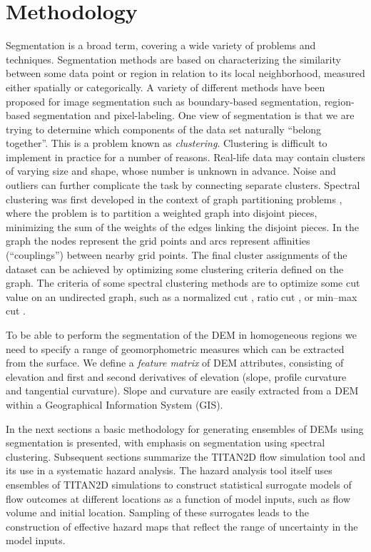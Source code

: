 \documentclass[12pt,letterpaper]{article}
\begin{document}
\section{Methodology}
Segmentation is a broad term, covering a wide variety of problems and techniques. 
Segmentation methods are based on characterizing the similarity between some data point or region 
in relation to its local neighborhood, measured either spatially or categorically. A variety of different methods have been proposed 
for image segmentation such as boundary-based segmentation, region-based segmentation and pixel-labeling. 
One view of segmentation is that we are trying to determine which components of the data set naturally 
``belong together''. This is a problem known as \textit{clustering}. Clustering is difficult to implement in practice for a number of reasons.
Real-life data may contain clusters of varying size and shape, whose number is unknown in advance. Noise 
and outliers can further complicate the task by connecting separate clusters. 
Spectral clustering was first developed in the context of graph partitioning problems \citep{Donath1973}, 
where the problem is to partition a weighted graph into disjoint pieces, minimizing the sum of the weights of the edges 
linking the disjoint pieces. In the graph the nodes represent the grid points and arcs represent affinities (``couplings'') 
between nearby grid points. The final cluster assignments of the dataset can be achieved by optimizing some clustering 
criteria defined on the graph. The criteria of some spectral clustering methods are to optimize some cut value on an 
undirected graph, such as a normalized cut \citep{ShiMalik2000}, ratio cut \citep{Hagen1992}, or min--max cut \citep{Ding2001}. 

To be able to perform the segmentation of the DEM in homogeneous regions
we need to specify a range of geomorphometric measures which can be extracted
from the surface. We define a \textit{feature matrix} of DEM attributes, consisting of elevation and 
first and second derivatives of elevation (slope, profile curvature and tangential curvature).
Slope and curvature are easily extracted from a DEM within a Geographical Information System (GIS).

In the next sections a basic methodology for generating ensembles of DEMs using segmentation is presented, with emphasis 
on segmentation using spectral clustering.  Subsequent sections summarize the TITAN2D flow simulation tool and its use 
in a systematic hazard analysis. The hazard analysis tool itself uses ensembles of TITAN2D simulations to construct statistical surrogate models of flow outcomes at different locations as a function of model inputs, such as flow volume and initial 
location. Sampling of these surrogates leads to the construction of effective hazard maps that reflect the range of uncertainty 
in the model inputs.
\end{document}

